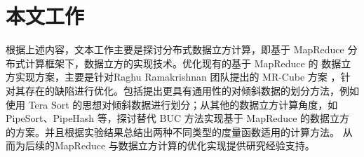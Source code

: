 \section{本文工作}

根据上述内容，文本工作主要是探讨分布式数据立方计算，即基于 MapReduce 分布式计算框架下，数据立方的实现技术。优化现有的基于 MapReduce 的 数据立方实现方案，主要是针对Raghu Ramakrishnan 团队提出的 MR-Cube 方案 \cite{nandi2012data} \cite{nandi2011distributed}，针对其存在的缺陷进行优化。包括提出更具有通用性的对倾斜数据的划分方法，例如使用 Tera Sort 的思想对倾斜数据进行划分；从其他的数据立方计算角度，如 PipeSort、PipeHash 等，探讨替代 BUC 方法实现基于 MapReduce 的数据立方的方案。并且根据实验结果总结出两种不同类型的度量函数适用的计算方法。 从而为后续的MapReduce 与数据立方计算的优化实现提供研究经验支持。


